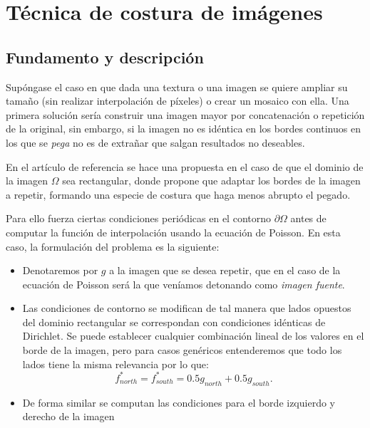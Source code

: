 \documentclass[11pt,twoside,titlepage,a4paper]{article}
\numberwithin{equation}{section} %
\theoremstyle{usual}
\begin{document}
\newpage

\section{Técnica de costura de imágenes}

\subsection{Fundamento y descripción}

Supóngase el caso en que dada una textura o una imagen se quiere ampliar su tamaño (sin realizar interpolación de píxeles) o crear un mosaico con ella. Una primera solución sería construir una imagen mayor por concatenación o repetición de la original, sin embargo, si la imagen no es idéntica en los bordes continuos en los que se \textit{pega} no es de extrañar que salgan resultados no deseables. 

En el artículo de referencia  \cite{poissonImageEditing} se  hace una propuesta en el caso de que el dominio de la imagen $\Omega$ sea rectangular, donde propone que adaptar los bordes de la imagen a repetir, formando una especie de costura que haga menos abrupto el pegado. 

Para ello fuerza ciertas condiciones periódicas en el contorno $\partial\Omega$ antes de computar la función de interpolación usando la ecuación de Poisson. En esta caso, la formulación del problema es la siguiente:

\begin{itemize}
    \item Denotaremos por $g$ a la imagen que se desea repetir, que en el caso de la ecuación de Poisson será la que veníamos detonando como \textit{imagen fuente}.
    \item Las condiciones de contorno se modifican de tal manera que lados opuestos del dominio rectangular se correspondan con condiciones idénticas de Dirichlet. Se puede establecer cualquier combinación lineal de los valores en el borde de la imagen, pero para casos genéricos entenderemos que todo los lados tiene la misma relevancia por lo que: 
    \begin{equation}
        f^*_{north} = f^*_{south} = 0.5 g_{north} + 0.5 g_{south} .
    \end{equation}
    \item De forma similar se computan las condiciones para el borde izquierdo y derecho de la imagen
\end{itemize}
\end{document}
